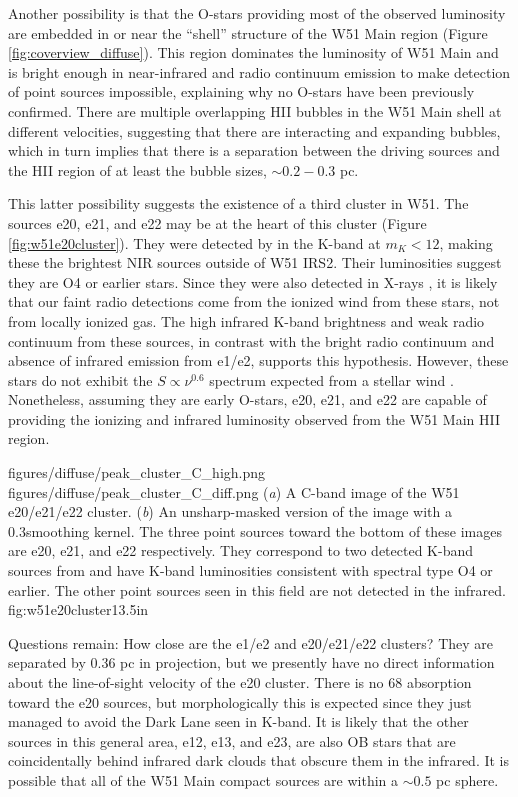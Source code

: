 Another possibility is that the O-stars providing most of the observed
luminosity are embedded in or near the ``shell'' structure of the W51 Main
region (Figure \ref{fig:coverview_diffuse}).  This region dominates the
luminosity of W51 Main and is bright enough in near-infrared and radio
continuum emission to make detection of point sources impossible, explaining
why no O-stars have been previously confirmed.  There are multiple overlapping
HII bubbles in the W51 Main shell at different velocities, suggesting that
there are interacting and  expanding bubbles, which in turn implies that there
is a separation between the driving sources and the HII region of at least the
bubble sizes, $\sim0.2-0.3$ pc.  

This latter possibility suggests the existence of a third cluster in W51.  The
sources e20, e21, and e22 may be at the heart of this cluster (Figure
\ref{fig:w51e20cluster}).  They
were detected by \citet{Goldader1994a} in the K-band at $m_K < 12$, making
these the brightest NIR sources outside of W51 IRS2.  Their luminosities
suggest they are O4 or earlier stars.  Since they were also detected
in X-rays \citet{Townsley2014a}, it is likely that our faint radio detections
come from the ionized wind from these stars, not from locally ionized gas.
The high infrared K-band brightness and weak radio continuum from these sources,
in contrast with the bright radio continuum and absence of infrared emission
from e1/e2, supports this hypothesis.  However, these stars do not exhibit
the $S\propto \nu^{0.6}$ spectrum expected from a stellar wind
\citep{Wright1975a,Panagia1975a}.
Nonetheless, assuming they are early O-stars, e20, e21, and e22 are capable of
providing the ionizing and infrared luminosity observed from the W51 Main HII
region.

\FigureTwo
{figures/diffuse/peak_cluster_C_high.png}
{figures/diffuse/peak_cluster_C_diff.png}
{({\it a}) A C-band image of the W51 e20/e21/e22 cluster.
({\it b}) An unsharp-masked version of the image with a 0.3\arcsec smoothing
kernel. 
The three point sources toward the bottom of these images are e20, e21, and e22
respectively.  They correspond to two detected K-band sources from
\citet{Goldader1994a} and have K-band luminosities consistent with spectral
type O4 or earlier.  The other point sources seen in this field are not detected
in the infrared.
}
{fig:w51e20cluster}{1}{3.5in}


Questions remain: 
How close are the e1/e2 and e20/e21/e22 clusters?  They are
separated by 0.36 pc in projection, but we presently have no direct information
about the line-of-sight velocity of the e20 cluster.  There is no 68 \kms
\formaldehyde absorption toward the e20 sources, but morphologically this is
expected since they just managed to avoid the Dark Lane seen in K-band.  It is
likely that the other sources in this general area, e12, e13, and e23, are also
OB stars that are coincidentally behind infrared dark clouds that obscure them
in the infrared.  It is possible that all of the W51 Main compact sources are
within a $\sim 0.5$ pc sphere.

